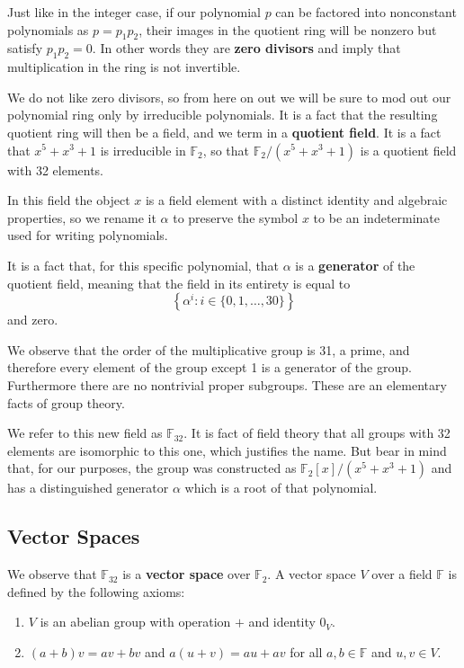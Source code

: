 \documentclass[letterpaper]{article}
\theoremstyle{xxx}
\theoremstyle{evil}
\theoremstyle{yyy}
\theoremstyle{plain}
\theoremstyle{zzz}
\newcommand{\ftwo}{\mathbb{F}_2}
\newcommand{\fttwo}{\mathbb{F}_{32}}
\begin{document}
Just like in the integer case, if our polynomial $p$ can be factored into
nonconstant polynomials as $p=p_1p_2$, their images in the quotient ring will
be nonzero but satisfy $p_1p_2 = 0$. In other words they are \textbf{zero
divisors} and imply that multiplication in the ring is not invertible.

We do not like zero divisors, so from here on out we will be sure to mod out
our polynomial ring only by irreducible polynomials. It is a fact that the
resulting quotient ring will then be a field, and we term in a \textbf{quotient
field}. It is a fact that $x^5 + x^3 + 1$ is irreducible in $\ftwo$, so that
$\ftwo/(x^5 + x^3 + 1)$ is a quotient field with 32 elements.

In this field the object $x$ is a field element with a distinct identity and
algebraic properties, so we rename it $\alpha$ to preserve the symbol $x$ to
be an indeterminate used for writing polynomials.

It is a fact that, for this specific polynomial, that $\alpha$ is a
\textbf{generator} of the quotient field, meaning that the field in its entirety
is equal to
\[ \left\{ \alpha^i : i \in \{0,1,\ldots,30\} \right\} \]
and zero.

We observe that the order of the multiplicative group is 31, a prime, and therefore
every element of the group except 1 is a generator of the group. Furthermore there
are no nontrivial proper subgroups. These are an elementary facts of group theory.

We refer to this new field as $\fttwo$. It is fact of field theory that all
groups with 32 elements are isomorphic to this one, which justifies the name.
But bear in mind that, for our purposes, the group was constructed as $\ftwo[x]/
(x^5 + x^3 + 1)$ and has a distinguished generator $\alpha$ which is a root
of that polynomial.

\subsection{Vector Spaces}

We observe that $\fttwo$ is a \textbf{vector space} over $\ftwo$. A vector
space $V$ over a field $\mathbb{F}$ is defined by the following axioms:

\begin{enumerate}
\item $V$ is an abelian group with operation $+$ and identity $0_V$.
\item $(a + b)v = av + bv$ and $a(u + v) = au + av$ for all $a,b\in \mathbb{F}$ and
$u,v\in V$.
\end{enumerate}
\end{document}
